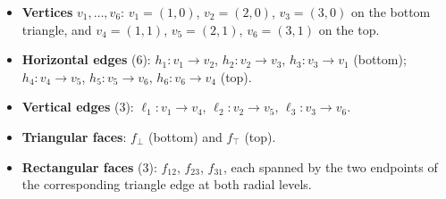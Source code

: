 \documentclass[11pt,a4paper]{article}
\begin{document}
\begin{itemize}[nosep]
  \item \textbf{Vertices} $v_1,\ldots,v_6$: $v_1 = (1,0)$, $v_2 = (2,0)$,
    $v_3 = (3,0)$ on the bottom triangle, and $v_4 = (1,1)$, $v_5 = (2,1)$,
    $v_6 = (3,1)$ on the top.
  \item \textbf{Horizontal edges} (6): $h_1: v_1 \to v_2$,
    $h_2: v_2 \to v_3$, $h_3: v_3 \to v_1$ (bottom); $h_4: v_4 \to v_5$,
    $h_5: v_5 \to v_6$, $h_6: v_6 \to v_4$ (top).
  \item \textbf{Vertical edges} (3): $\ell_1: v_1 \to v_4$,
    $\ell_2: v_2 \to v_5$, $\ell_3: v_3 \to v_6$.
  \item \textbf{Triangular faces}: $f_\bot$ (bottom) and $f_\top$ (top).
  \item \textbf{Rectangular faces} (3): $f_{12}$, $f_{23}$, $f_{31}$, each
    spanned by the two endpoints of the corresponding triangle edge at both
    radial levels.
\end{itemize}
\end{document}
